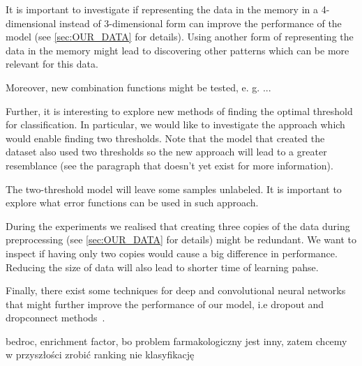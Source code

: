 \documentclass[a4paper,10pt]{report}
\begin{document}
      It is important to investigate if representing the data in the memory in a 4-dimensional instead of 3-dimensional form can improve the performance of the model (see \ref{sec:OUR_DATA} for details). Using another form of representing the data in the memory might lead to discovering other patterns which can be more relevant for this data. 
      
      Moreover, new combination functions might be tested, e. g. ...  %
      
      Further, it is interesting to explore new methods of finding the optimal threshold for classification. In particular, we would like to investigate the approach which would enable finding two thresholds. Note that the model that created the dataset also used two thresholds so the new approach will lead to a greater resemblance (see the paragraph that doesn't yet exist for more information). 
      
      The two-threshold model will leave some samples unlabeled. It is important to explore what error functions can be used in such approach. 
      
      During the experiments we realised that creating three copies of the data during preprocessing (see \ref{sec:OUR_DATA} for details) might be redundant. We want to inspect if having only two copies would cause a big difference in performance. Reducing the size of data will also lead to shorter time of learning pahse.
      
      Finally, there exist some techniques for deep and convolutional neural networks that might further improve the performance of our model, i.e dropout and dropconnect methods~\cite{DUTCH}.
      
      bedroc, enrichment factor, bo problem farmakologiczny jest inny, zatem chcemy w przyszłości zrobić ranking nie klasyfikację
\end{document}
